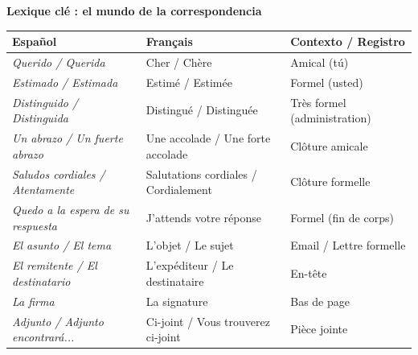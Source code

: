 \documentclass[11pt]{article}
\newcommand{\esp}[1]{\ifmmode\text{\textit{#1}}\else\begingroup\selectlanguage{spanish}\itshape #1\endgroup\fi}
\begin{document}
\begin{bilan}

\textbf{Lexique clé : el mundo de la correspondencia}
\begin{center}
\begin{tabularx}{\linewidth}{|X|X|X|}
\hline
\rowcolor{popblueL}
\textbf{Español} & \textbf{Français} & \textbf{Contexto / Registro} \\
\hline
\esp{Querido / Querida} & Cher / Chère & Amical (tú) \\
\esp{Estimado / Estimada} & Estimé / Estimée & Formel (usted) \\
\esp{Distinguido / Distinguida} & Distingué / Distinguée & Très formel (administration) \\
\esp{Un abrazo / Un fuerte abrazo} & Une accolade / Une forte accolade & Clôture amicale \\
\esp{Saludos cordiales / Atentamente} & Salutations cordiales / Cordialement & Clôture formelle \\
\esp{Quedo a la espera de su respuesta} & J'attends votre réponse & Formel (fin de corps) \\
\esp{El asunto / El tema} & L'objet / Le sujet & Email / Lettre formelle \\
\esp{El remitente / El destinatario} & L'expéditeur / Le destinataire & En-tête \\
\esp{La firma} & La signature & Bas de page \\
\esp{Adjunto / Adjunto encontrará...} & Ci-joint / Vous trouverez ci-joint & Pièce jointe \\
\hline
\end{tabularx}
\end{center}


\end{bilan}
\end{document}
